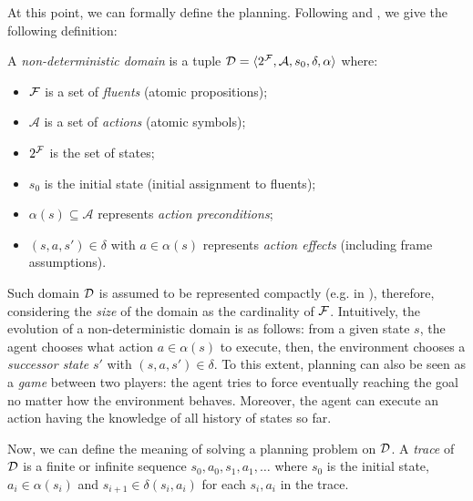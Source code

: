 At this point, we can formally define the \FOND planning. Following \citep{ghallab2004automated} and \citep{geffner2013concise}, we give the following definition:
\begin{definition}
A \textit{non-deterministic domain} is a tuple $\mathcal{D} = \langle 2^{\mathcal{F}}, \mathcal{A}, s_0, \delta, \alpha \rangle$ where:
\begin{itemize}
\item $\mathcal{F}$ is a set of \textit{fluents} (atomic propositions);
\item $\mathcal{A}$ is a set of \textit{actions} (atomic symbols);
\item $2^{\mathcal{F}}$ is the set of states;
\item $s_0$ is the initial state (initial assignment to fluents);
\item $\alpha(s) \subseteq \mathcal{A}$ represents \textit{action preconditions};
\item $(s, a, s') \in \delta$ with $a \in \alpha(s)$ represents \textit{action effects} (including frame assumptions).
\end{itemize}
\end{definition}
\noindent Such domain $\mathcal{D}$ is assumed to be represented compactly (e.g. in \PDDL), therefore, considering the \textit{size} of the domain as the cardinality of $\mathcal{F}$. Intuitively, the evolution of a non-deterministic domain is as follows: from a given state $s$, the agent chooses what action $a \in \alpha(s)$ to execute, then, the environment chooses a \textit{successor state} $s'$ with $(s,a,s') \in \delta$. To this extent, planning can also be seen as a \textit{game} between two players: the agent tries to force eventually reaching the goal no matter how the environment behaves.
Moreover, the agent can execute an action having the knowledge of all history of states so far.

Now, we can define the meaning of solving a \FOND planning problem on $\mathcal{D}$. A \textit{trace} of $\mathcal{D}$ is a finite or infinite sequence $s_0,a_0,s_1,a_1, \dots$ where $s_0$ is the initial state, $a_i \in \alpha(s_i)$ and $s_{i+1} \in \delta(s_i,a_i)$ for each $s_i,a_i$ in the trace.

